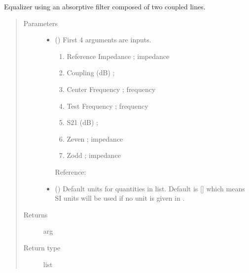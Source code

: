 \documentclass[letterpaper,10pt,english]{sphinxmanual}
\begin{document}
\begin{fulllineitems}
\label{\detokenize{components:components.Absorptive_Filter_Equalizer}}
Equalizer using an absorptive filter composed of two coupled lines.
\begin{quote}\begin{description}
\item[{Parameters}] \leavevmode\begin{itemize}
\item {} 
 () \textendash{} 
First 4 arguments are inputs.
\begin{enumerate}
%
\item {} 
Reference Impedance ; impedance

\item {} 
Coupling (dB) ;

\item {} 
Center Frequency ; frequency

\item {} 
Test Frequency ; frequency

\item {} 
S21 (dB) ;

\item {} 
Zeven ;  impedance

\item {} 
Zodd ;  impedance

\end{enumerate}

Reference:


\item {} 
 (\sphinxstyleliteralemphasis{\sphinxupquote{, }}) \textendash{} Default units for quantities in  list. Default is {[}{]} which means SI units will be used if no unit is given in .

\end{itemize}

\item[{Returns}] \leavevmode
arg

\item[{Return type}] \leavevmode
list

\end{description}\end{quote}

\end{fulllineitems}
\end{document}

